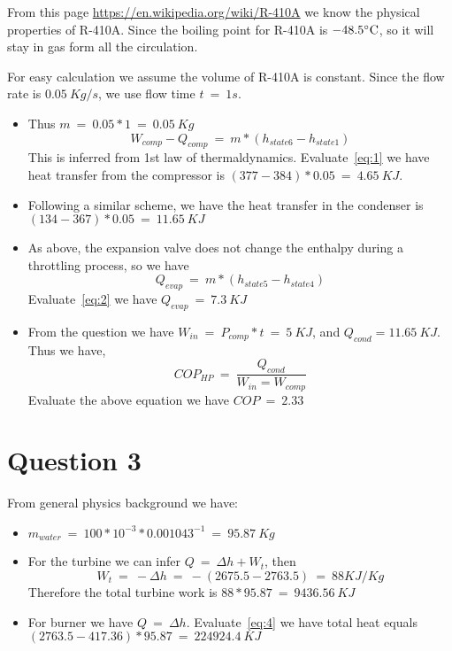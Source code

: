 \documentclass[12pt]{article}
\begin{document}
From this page \url{https://en.wikipedia.org/wiki/R-410A} we know the
physical properties of R-410A. Since the boiling point for R-410A is
$-48.5\celsius$, so it will stay in gas form all the circulation.
\par
For easy calculation we assume the volume of R-410A is constant. Since
the flow rate is $0.05~Kg/s$, we use flow time $t~=~1s$.
\begin{itemize}
\item Thus $m~=~0.05 * 1~=~0.05~Kg$
  \begin{equation}
    \label{eq:1}
    W_{comp}-Q_{comp}~=~m*(h_{state6}-h_{state1})
  \end{equation}
  This is inferred from 1st law of
  thermaldynamics. Evaluate~\eqref{eq:1} we have heat transfer from the
  compressor is $(377-384)*0.05~=~4.65~KJ$.
\item Following a similar scheme, we have the heat transfer in the
  condenser is $(134-367)*0.05~=~11.65~KJ$
\item As above, the expansion valve does not change the enthalpy
  during a throttling process, so we have
  \begin{equation}
    \label{eq:2}
    Q_{evap}~=~m*(h_{state5}-h_{state4})
  \end{equation}
  Evaluate~\eqref{eq:2} we have $Q_{evap}~=~7.3~KJ$
\item From the question we have $W_{in}~=~P_{comp}*t~=~5~KJ$, and
  $Q_{cond}=11.65~KJ$. Thus we have,
  \begin{equation}
    \label{eq:3}
    COP_{HP}~=~\frac{Q_{cond}}{W_{in}=W_{comp}}
  \end{equation}
  Evaluate the above equation we have $COP~=~2.33$
\end{itemize}

\section{Question 3}
\label{sec:question-3}

From general physics background we have:
\begin{itemize}
\item $m_{water}~=~100*10^{-3}*0.001043^{-1}~=~95.87~Kg$
\item For the turbine we can infer $Q~=~\Delta h+ W_{t}$, then
  \begin{equation}
    \label{eq:4}
    W_{t}~=~-\Delta h~=~-(2675.5-2763.5)~=~88 KJ/Kg
  \end{equation}
  Therefore the total turbine work is $88 * 95.87~=~9436.56~KJ$
\item For burner we have $Q~=~\Delta h$.
  Evaluate~\eqref{eq:4} we have total heat equals
  $(2763.5-417.36)*95.87~=~224924.4~KJ$ 
\end{itemize}
\end{document}
